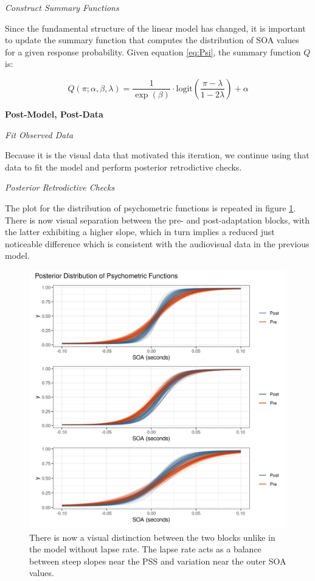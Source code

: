 \documentclass[11pt, oneside, openany]{scrbook}
\begin{document}
\emph{Construct Summary Functions}

Since the fundamental structure of the linear model has changed, it is important to update the summary function that computes the distribution of SOA values for a given response probability. Given equation \eqref{eq:Psi}, the summary function \(Q\) is:

\begin{equation}
Q(\pi; \alpha, \beta, \lambda) = \frac{1}{\exp(\beta)} \cdot \mathrm{logit}\left(\frac{\pi - \lambda}{1-2\lambda}\right) + \alpha
\label{eq:Psi-Q}
\end{equation}

\textbf{Post-Model, Post-Data}

\emph{Fit Observed Data}

Because it is the visual data that motivated this iteration, we continue using that data to fit the model and perform posterior retrodictive checks.

\emph{Posterior Retrodictive Checks}

The plot for the distribution of psychometric functions is repeated in figure \ref{fig:ch044-Screaming-Proton}. There is now visual separation between the pre- and post-adaptation blocks, with the latter exhibiting a higher slope, which in turn implies a reduced just noticeable difference which is consistent with the audiovisual data in the previous model.

\begin{figure}

{\centering \includegraphics[width=0.85\linewidth]{figures/ch044-Screaming-Proton} 

}

\caption{There is now a visual distinction between the two blocks unlike in the model without lapse rate. The lapse rate acts as a balance between steep slopes near the PSS and variation near the outer SOA values.}\label{fig:ch044-Screaming-Proton}
\end{figure}
\end{document}
